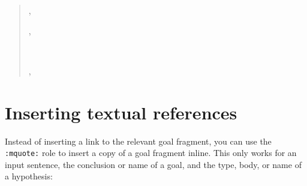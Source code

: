 \documentclass[a4paper]{article}
\begin{document}
\begin{quote}
\begin{alectryon}
  \sep
  \begin{sentence}
    \begin{input}
      \nl
    \end{input}
  \end{sentence}
  \sep
  \begin{sentence}
    \begin{input}
      ~
    \end{input}
    \sep
    \begin{output}
      \begin{messages}
        \begin{message}
          \nl
          \nl
          \nl
          \nl
          \nl
          \nl
        \end{message}
      \end{messages}
    \end{output}
  \end{sentence}
\end{alectryon}
\end{quote}


\section{Inserting textual references%
  \label{inserting-textual-references}%
}

Instead of inserting a link to the relevant goal fragment, you can use the \texttt{:mquote:} role to insert a copy of a goal fragment inline. This only works for an input sentence, the conclusion or name of a goal, and the type, body, or name of a hypothesis:
\end{document}
